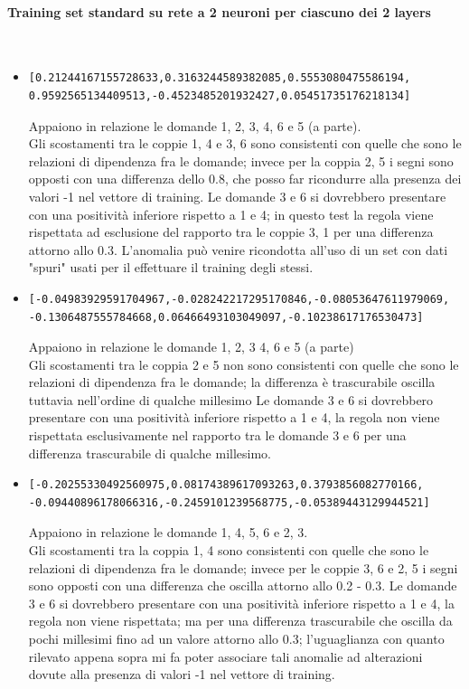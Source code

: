\paragraph{Training set standard su rete a 2 neuroni per ciascuno dei 2 layers}\mbox{}
\label{Training set standard su rete a 2 neuroni per ciascuno dei 2 layers}
\\
\noindent
\begin{itemize}
\item \begin{verbatim}[0.21244167155728633,0.3163244589382085,0.5553080475586194,
0.9592565134409513,-0.4523485201932427,0.05451735176218134]\end{verbatim}
Appaiono in relazione le domande 1, 2, 3, 4, 6 e 5 (a parte).\\
Gli scostamenti tra le coppie 1, 4 e 3, 6 sono consistenti con quelle che sono le relazioni di dipendenza fra le domande; invece per la coppia 2, 5 i segni sono opposti con una differenza dello 0.8, che posso far ricondurre alla presenza dei valori -1 nel vettore di training.
Le domande 3 e 6 si dovrebbero presentare con una positivit\`a inferiore rispetto a 1 e 4; in questo test la regola viene rispettata ad esclusione del rapporto tra le coppie 3, 1 per una differenza attorno allo 0.3. L'anomalia pu\`o venire ricondotta all'uso di un set con dati "spuri" usati per il effettuare il training degli stessi.

\item \begin{verbatim}[-0.04983929591704967,-0.028242217295170846,-0.08053647611979069,
-0.1306487555784668,0.06466493103049097,-0.10238617176530473]
\end{verbatim}
Appaiono in relazione le domande 1, 2, 3  4, 6 e 5 (a parte)\\
Gli scostamenti tra le coppia 2 e 5 non sono consistenti con quelle che sono le relazioni di dipendenza fra le domande; la differenza \`e trascurabile oscilla tuttavia nell'ordine di qualche millesimo
Le domande 3 e 6 si dovrebbero presentare con una positivit\`a inferiore rispetto a 1 e 4, la regola  non viene rispettata esclusivamente nel rapporto tra le domande 3 e 6 per una differenza trascurabile di qualche millesimo.

\item \begin{verbatim}[-0.20255330492560975,0.08174389617093263,0.3793856082770166,
-0.09440896178066316,-0.2459101239568775,-0.05389443129944521]
\end{verbatim}
Appaiono in relazione le domande 1, 4, 5, 6 e 2, 3.\\
Gli scostamenti tra la coppia 1, 4 sono consistenti con quelle che sono le relazioni di dipendenza fra le domande; invece per le coppie 3, 6 e 2, 5 i segni sono opposti con una differenza che oscilla attorno allo 0.2 - 0.3.
Le domande 3 e 6 si dovrebbero presentare con una positivit\`a inferiore rispetto a 1 e 4, la regola non viene rispettata; ma per una differenza trascurabile che oscilla da pochi millesimi fino ad un valore attorno allo 0.3; l'uguaglianza con quanto rilevato appena sopra mi fa poter associare tali anomalie ad alterazioni dovute alla presenza di valori -1 nel vettore di training.


\end{itemize}
